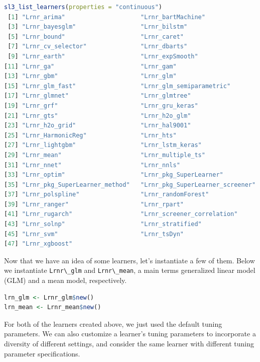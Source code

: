 \documentclass[
  12pt, krantz2,
]{krantz}
\newcommand{\passthrough}[1]{#1}
\newcommand{\1}{\mathbbm{1}}
\theoremstyle{definition}
\theoremstyle{definition}
\theoremstyle{definition}
\theoremstyle{definition}
\theoremstyle{remark}
\begin{document}
\begin{lstlisting}[language=R]
sl3_list_learners(properties = "continuous")
 [1] "Lrnr_arima"                     "Lrnr_bartMachine"              
 [3] "Lrnr_bayesglm"                  "Lrnr_bilstm"                   
 [5] "Lrnr_bound"                     "Lrnr_caret"                    
 [7] "Lrnr_cv_selector"               "Lrnr_dbarts"                   
 [9] "Lrnr_earth"                     "Lrnr_expSmooth"                
[11] "Lrnr_ga"                        "Lrnr_gam"                      
[13] "Lrnr_gbm"                       "Lrnr_glm"                      
[15] "Lrnr_glm_fast"                  "Lrnr_glm_semiparametric"       
[17] "Lrnr_glmnet"                    "Lrnr_glmtree"                  
[19] "Lrnr_grf"                       "Lrnr_gru_keras"                
[21] "Lrnr_gts"                       "Lrnr_h2o_glm"                  
[23] "Lrnr_h2o_grid"                  "Lrnr_hal9001"                  
[25] "Lrnr_HarmonicReg"               "Lrnr_hts"                      
[27] "Lrnr_lightgbm"                  "Lrnr_lstm_keras"               
[29] "Lrnr_mean"                      "Lrnr_multiple_ts"              
[31] "Lrnr_nnet"                      "Lrnr_nnls"                     
[33] "Lrnr_optim"                     "Lrnr_pkg_SuperLearner"         
[35] "Lrnr_pkg_SuperLearner_method"   "Lrnr_pkg_SuperLearner_screener"
[37] "Lrnr_polspline"                 "Lrnr_randomForest"             
[39] "Lrnr_ranger"                    "Lrnr_rpart"                    
[41] "Lrnr_rugarch"                   "Lrnr_screener_correlation"     
[43] "Lrnr_solnp"                     "Lrnr_stratified"               
[45] "Lrnr_svm"                       "Lrnr_tsDyn"                    
[47] "Lrnr_xgboost"                  
\end{lstlisting}

Now that we have an idea of some learners, let's instantiate a few of them.
Below we instantiate \passthrough{\lstinline!Lrnr\_glm!} and \passthrough{\lstinline!Lrnr\_mean!}, a main terms generalized
linear model (GLM) and a mean model, respectively.

\begin{lstlisting}[language=R]
lrn_glm <- Lrnr_glm$new()
lrn_mean <- Lrnr_mean$new()
\end{lstlisting}

For both of the learners created above, we just used the default tuning
parameters. We can also customize a learner's tuning parameters to incorporate
a diversity of different settings, and consider the same learner with different
tuning parameter specifications.
\end{document}

